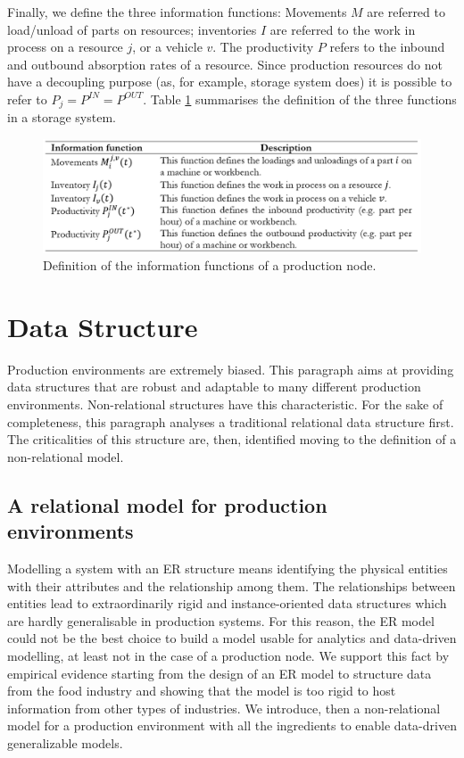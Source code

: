 Finally, we define the three information functions: Movements $M$ are referred to load/unload of parts on resources; inventories $I$ are referred to the work in process on a resource $j$, or a vehicle $v$. The productivity $P$ refers to the inbound and outbound absorption rates of a resource. Since production resources do not have a decoupling purpose (as, for example, storage system does) it is possible to refer to $P_j=P^{IN}=P^{OUT}$. Table \ref{tab_information_framework_prod} summarises the definition of the three functions in a storage system.

\begin{figure}[hbt!]
\centering
\includegraphics[width=1\textwidth]{sectionProduction/diagnosticModels_figures/tab_information_framework_prod.png}
\captionsetup{type=table}
\caption{Definition of the information functions of a production node.}
\label{tab_information_framework_prod}
\end{figure}


\section{Data Structure} \label{secDataStructureProduction}
Production environments are extremely biased. This paragraph aims at providing data structures that are robust and adaptable to many different production environments. Non-relational structures have this characteristic. For the sake of completeness, this paragraph analyses a traditional relational data structure first. The criticalities of this structure are, then, identified moving to the definition of a non-relational model.

\subsection{A relational model for production environments} \label{secRelationalModelProduction}
Modelling a system with an ER structure means identifying the physical entities with their attributes and the relationship among them. The relationships between entities lead to extraordinarily rigid and instance-oriented data structures which are hardly generalisable in production systems. For this reason, the ER model could not be the best choice to build a model usable for analytics and data-driven modelling, at least not in the case of a production node. We support this fact by empirical evidence starting from the design of an ER model to structure data from the food industry and showing that the model is too rigid to host information from other types of industries. We introduce, then a non-relational model for a production environment with all the ingredients to enable data-driven generalizable models.\par

